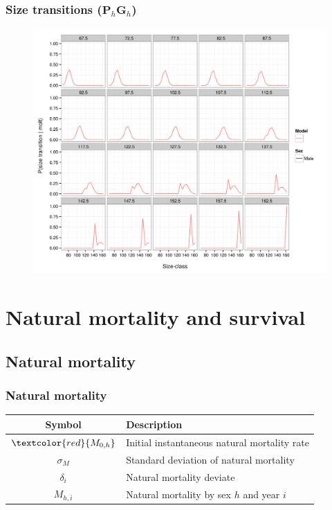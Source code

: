 \documentclass{beamer}
\begin{document}
\begin{frame}
\frametitle{Size transitions  ($\boldsymbol{P}_h \boldsymbol{G}_h$)}
\begin{figure}[!htbp]
  \centering
  \includegraphics[width=0.75\linewidth]{../../examples/bbrkc/OneSex/figure/size_transition.png}
\end{figure}
\end{frame}


\section{Natural mortality and survival}


\subsection{Natural mortality}
\begin{frame}
\frametitle{Natural mortality}
\begin{table}
  \centering
  \begin{tabular}{cl}
  \hline
  Symbol  & Description \\
  \hline
      $\textcolor{red}{M_{0,h}}$ & Initial instantaneous natural mortality rate \\
      $\sigma_M$ & Standard deviation of natural mortality \\
      $\delta_i$ & Natural mortality deviate \\
      $M_{h,i}$ & Natural mortality by sex $h$ and year $i$ \\
  \hline
  \end{tabular}
\end{table}
\end{frame}
\end{document}
